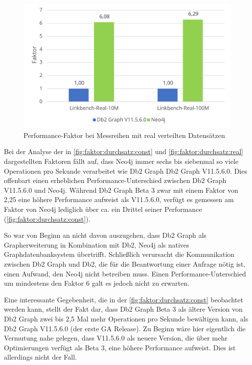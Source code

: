 \begin{figure}[!ht]
    \centering
    \includegraphics[width=\textwidth]{images/diagramme/faktor_durchschittlicher_durchsatz_real.pdf}
    \caption{Performance-Faktor bei Messreihen mit real verteilten Datensätzen}
    \label{fig:faktor:durchsatz:real}
\end{figure}

Bei der Analyse der in \autoref{fig:faktor:durchsatz:const} und \autoref{fig:faktor:durchsatz:real} dargestellten Faktoren fällt auf, dass Neo4j immer sechs bis siebenmal so viele Operationen pro Sekunde verarbeitet wie Db2 Graph Db2 Graph V11.5.6.0. Dies offenbart einen erheblichen Performance-Unterschied zwischen Db2 Graph V11.5.6.0 und Neo4j. Während Db2 Graph Beta 3 zwar mit einem Faktor von 2,25 eine höhere Performance aufweist als V11.5.6.0, verfügt es gemessen am Faktor von Neo4j lediglich über ca. ein Drittel seiner Performance (\autoref{fig:faktor:durchsatz:const}).  

So war von Beginn an nicht davon auszugehen, dass Db2 Graph als Grapherweiterung in Kombination mit Db2, Neo4j als natives Graphdatenbanksystem übertrifft. Schließlich verursacht die Kommunikation zwischen Db2 Graph und Db2, die für die Beantwortung einer Anfrage nötig ist, einen Aufwand, den Neo4j nicht betreiben muss. Einen Performance-Unterschied um mindestens den Faktor 6 galt es jedoch nicht zu erwarten. 

Eine interessante Gegebenheit, die in der \autoref{fig:faktor:durchsatz:const} beobachtet werden kann, stellt der Fakt dar, dass Db2 Graph Beta 3 als ältere Version von Db2 Graph zwei bis 2,5 Mal mehr Operationen pro Sekunde bewältigen kann, als Db2 Graph V11.5.6.0 (der erste GA Release). Zu Beginn wäre hier eigentlich die Vermutung nahe gelegen, dass V11.5.6.0 als neuere Version, die über mehr Optimierungen verfügt als Beta 3, eine höhere Performance aufweist. Dies ist allerdings nicht der Fall. 

